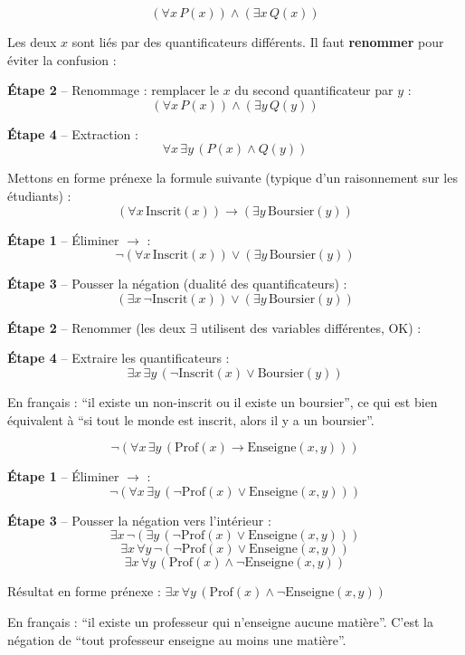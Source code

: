 \documentclass[11pt,a4paper]{article}
\begin{document}
\begin{exemplebox}
$$(\forall x \, P(x)) \land (\exists x \, Q(x))$$

Les deux $x$ sont liés par des quantificateurs différents. Il faut \textbf{renommer} pour éviter la confusion :

\textbf{Étape 2} -- Renommage : remplacer le $x$ du second quantificateur par $y$ :
$$(\forall x \, P(x)) \land (\exists y \, Q(y))$$

\textbf{Étape 4} -- Extraction :
$$\forall x \, \exists y \, (P(x) \land Q(y))$$
\end{exemplebox}

\begin{exemplebox}
Mettons en forme prénexe la formule suivante (typique d'un raisonnement sur les étudiants) :
$$(\forall x \, \text{Inscrit}(x)) \rightarrow (\exists y \, \text{Boursier}(y))$$

\textbf{Étape 1} -- Éliminer $\rightarrow$ :
$$\neg(\forall x \, \text{Inscrit}(x)) \lor (\exists y \, \text{Boursier}(y))$$

\textbf{Étape 3} -- Pousser la négation (dualité des quantificateurs) :
$$(\exists x \, \neg\text{Inscrit}(x)) \lor (\exists y \, \text{Boursier}(y))$$

\textbf{Étape 2} -- Renommer (les deux $\exists$ utilisent des variables différentes, OK) :

\textbf{Étape 4} -- Extraire les quantificateurs :
$$\exists x \, \exists y \, (\neg\text{Inscrit}(x) \lor \text{Boursier}(y))$$

En français : ``il existe un non-inscrit ou il existe un boursier'', ce qui est bien équivalent à ``si tout le monde est inscrit, alors il y a un boursier''.
\end{exemplebox}

\begin{exemplebox}
$$\neg(\forall x \, \exists y \, (\text{Prof}(x) \rightarrow \text{Enseigne}(x, y)))$$

\textbf{Étape 1} -- Éliminer $\rightarrow$ :
$$\neg(\forall x \, \exists y \, (\neg\text{Prof}(x) \lor \text{Enseigne}(x, y)))$$

\textbf{Étape 3} -- Pousser la négation vers l'intérieur :
$$\exists x \, \neg(\exists y \, (\neg\text{Prof}(x) \lor \text{Enseigne}(x, y)))$$
$$\exists x \, \forall y \, \neg(\neg\text{Prof}(x) \lor \text{Enseigne}(x, y))$$
$$\exists x \, \forall y \, (\text{Prof}(x) \land \neg\text{Enseigne}(x, y))$$

Résultat en forme prénexe : $\exists x \, \forall y \, (\text{Prof}(x) \land \neg\text{Enseigne}(x, y))$

En français : ``il existe un professeur qui n'enseigne aucune matière''. C'est la négation de ``tout professeur enseigne au moins une matière''.
\end{exemplebox}
\end{document}

